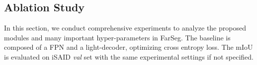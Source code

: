 \documentclass[10pt,twocolumn,letterpaper]{article}
\begin{document}
\begin{table}[]
   \caption{Foreground-aware optimization module analysis.
      \label{tab:opt_ablation}}
   \centering
   \renewcommand{\arraystretch}{1.5}
\end{table}

\subsection{Ablation Study}
In this section, we conduct comprehensive experiments to analyze the proposed modules and many important hyper-parameters in FarSeg.
The baseline is composed of a FPN and a light-decoder, optimizing cross entropy loss.
The mIoU is evaluated on iSAID \textit{val} set with the same experimental settings if not specified.
\end{document}
